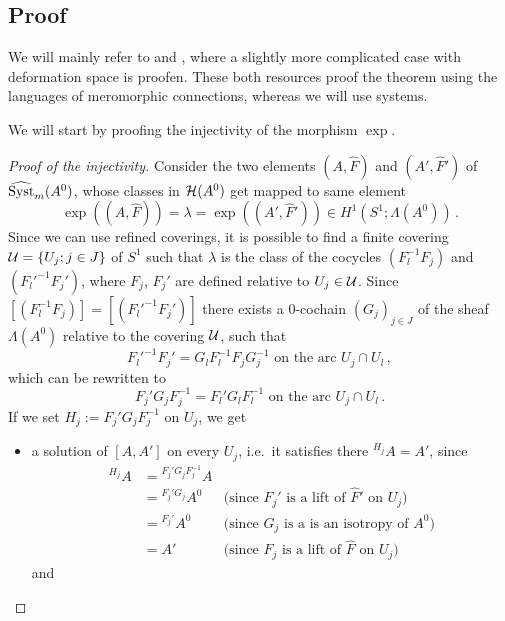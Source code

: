 \subsection{Proof}
We will mainly refer to \cite[Proof of Theorem 4.5.1]{babbitt1989local} and
\cite[Section 6.d]{sabbah2007isomonodromic}, where a slightly more complicated
case with deformation space is proofen. These both resources proof the theorem
using the languages of meromorphic connections, whereas we will use systems.

We will start by proofing the injectivity of the morphism $\exp$.
\begin{proof}[Proof of the injectivity]
  Consider the two elements $(A,\hat F)$ and $(A',\hat F')$ of
  $\widehat{\operatorname{Syst}}_m(A^0)$, whose classes in $\mathcal{H}(A^0)$ get mapped to same element
  \[
    \exp((A,\hat F))=\lambda=\exp((A',\hat F'))
      \in H^1(S^1;\Lambda(A^0)) \,.
  \]
  Since we can use refined coverings, it is possible to find a finite covering
  $\mathcal{U}=\{U_j;j\in J\}$ of $S^1$ such that $\lambda$ is the class of the
  cocycles $(F_l^{-1}F_j)$ and $(F_l'^{-1}F_j')$, where $F_j$, $F_j'$ are
  defined relative to $U_j\in\mathcal{U}$.
  Since $[(F_l^{-1}F_j)]=[(F_l'^{-1}F_j')]$ there exists a
  $0$-cochain $(G_j)_{j\in J}$ of the sheaf $\Lambda(A^0)$ relative to the
  covering $\mathcal{U}$, such that
  \[
    F_l'^{-1}F_j'=G_lF_l^{-1}F_jG_j^{-1}
    \text{~on~the~arc~} U_j\cap U_l \,,
  \]
  which can be rewritten to
  \[
    F_j'G_jF_j^{-1} = F_l'G_lF_l^{-1}
    \text{~on~the~arc~} U_j\cap U_l \,.
  \]
  If we set $H_j:=F_j'G_{j}F_j^{-1}$ on $U_{j}$, we get
  \begin{itemize}
    \item a solution of $[A,A']$ on every $U_j$, i.e.\ it
      satisfies there ${}^{H_j}A=A'$, since
      \begin{align*}
        {}^{H_j}A &= {}^{F_j'G_{j}F_j^{-1}}A
        \\&={}^{F_j'G_{j}}A^0
        & \text{(since $F_j'$ is a lift of $\hat F'$ on $U_j$)}
        \\&={}^{F_j'}A^0
        & \text{(since $G_j$ is a is an isotropy of $A^0$)}
        \\&=A'
        & \text{(since $F_j$ is a lift of $\hat F$ on $U_j$)}
      \end{align*}
      and

\end{itemize}
\end{proof}
